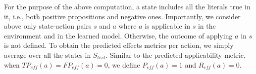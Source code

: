 \documentclass[letterpaper]{article} %
\newcommand{\eff}{\ensuremath{\textit{eff}}\xspace}
\newcommand{\realm}{{\ensuremath{M^*}}\xspace}
\newcommand{\stest}{\ensuremath{S_{\textit{test}}}\xspace}
\newif\ifaddcomments
\newcommand{\roni}[1]{\ifaddcomments{\textcolor{red}{[Roni: #1]}}\fi}
\newcommand{\argaman}[1]{\ifaddcomments{\textcolor{blue}{[Argaman: #1]}}\fi}
\newcommand{\gregor}[1]{\ifaddcomments{\textcolor{orange}{[Gregor: #1]}}\fi}
\newcommand{\cm}[1]{\ifaddcomments{\textcolor{olive}{[Christian: #1]}}\fi}
\newcommand{\leo}[1]{\ifaddcomments{\textcolor{pink}{[Leonardo: #1]}}\fi}
\begin{document}
For the purpose of the above computation, a state includes all the literals true in it, i.e., both positive propositions and negative ones. 
Importantly, we consider above only state-action pairs $s$ and $a$ where $a$ is applicable in $s$ in the environment and in the learned model. 
Otherwise, the outcome of applying $a$ in $s$ is not defined. 
To obtain the predicted effects metrics per action, we simply average over all the states in $\stest$. Similar to the predicted applicability metric, when $TP_{\eff}(a)=FP_{\eff}(a)=0$, we define $P_{\eff}(a)=1$ and $R_{\eff}(a)=0$. %
\end{document}
